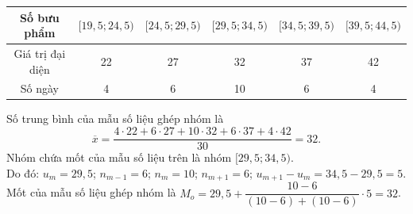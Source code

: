 \begin{ex}
{\begin{listEX}
\begin{center}
\begin{tabular}{|*6{c|}}
					\hline 
					Số bưu phẩm & $[19{,}5;  24{,}5)$ &$[24{,}5; 29{,}5)$ &$[29{,}5; 34{,}5)$ &$[34{,}5; 39{,}5)$ &$[39{,}5; 44{,}5)$ \\
					\hline 
					Giá trị đại diện & 22 & 27  & 32 & 37 & 42 \\
					 \hline
					Số ngày & 4 & 6 & 10 & 6 & 4 \\ 
					\hline 
				\end{tabular}
			\end{center}
			Số trung bình của mẫu số liệu ghép  nhóm là
			\[\overline{x}=\dfrac{4\cdot 22+6\cdot  27+10\cdot 32+6\cdot 37+4\cdot 42}{30}=32.\]
			 Nhóm chứa mốt của mẫu số liệu trên là nhóm $[29{,}5; 34{,}5)$.\\
			Do đó: $u_m=29{,}5$;  $n_{m-1}=6$; $n_m=10$; $n_{m+1}=6$; $u_{m+1}-u_m=34{,}5-29{,}5=5$.\\
			Mốt của mẫu số liệu ghép nhóm là $M_o=29{,}5+\dfrac{10-6}{(10-6)+(10-6)} \cdot  5=32$.
		\end{listEX}
	} 
\end{ex}

